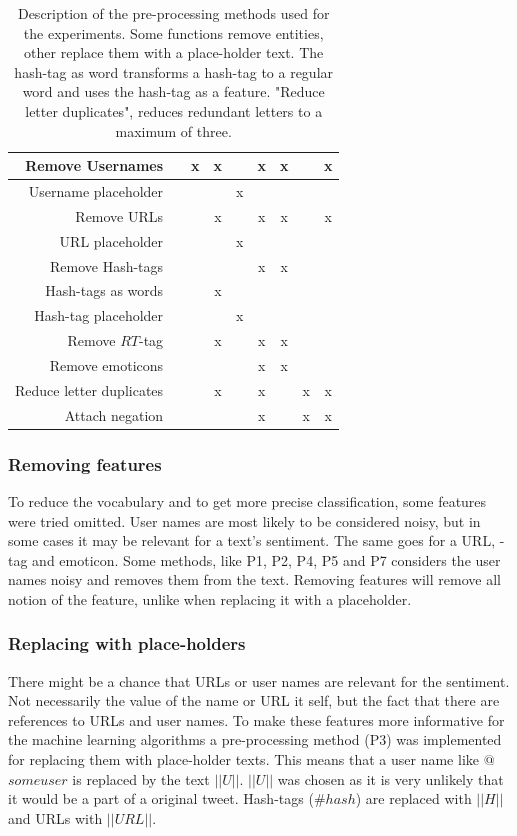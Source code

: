 \begin{table}[!htb]
\begin{tabular}{|r||c|c|c|c|c|c|c|c|}
	 
		Remove Usernames                     & & x & x &   & x & x & & x \\ \hline
		Username placeholder       & &   &   & x &   &   & & \\ \hline
		Remove URLs                          & &   & x &   & x & x & & x \\ \hline
		URL placeholder        & &   &   & x &   &   & & \\ \hline
		Remove Hash-tags                     & &   &   &   & x & x & & \\ \hline
		Hash-tags as words                   & &   & x &   &   &   & & \\ \hline
		Hash-tag placeholder          & &   &   & x &   &   & & \\ \hline
		Remove $RT$-tag                      & &   & x &   & x & x & & \\ \hline
		Remove emoticons                     & &   &   &   & x & x & & \\ \hline
		Reduce letter duplicates             & &   & x &   & x &   & x & x \\ \hline
		Attach negation  & &   &   &   & x &   & x & x \\ \hline
	\end{tabular}
	\caption[Description of used pre-processing methods]{Description of the pre-processing methods used for the experiments. Some functions remove entities, other replace them with a place-holder text. The hash-tag as word transforms a hash-tag to a regular word and uses the hash-tag as a feature. "Reduce letter duplicates", reduces redundant letters to a maximum of three.}
	\label{tab:preproc_desc}
\end{table}

\subsubsection{Removing features}
To reduce the vocabulary and to get more precise classification, some features were tried omitted. User names are most likely to be considered noisy, but in some cases it may be relevant for a text's sentiment. The same goes for a URL, -tag and emoticon. Some methods, like P1, P2, P4, P5 and P7 considers the user names noisy and removes them from the text. Removing features will remove all notion of the feature, unlike when replacing it with a placeholder.

\subsubsection{Replacing with place-holders}
There might be a chance that URLs or user names are relevant for the sentiment. Not necessarily the value of the name or URL it self, but the fact that there are references to URLs and user names. To make these features more informative for the machine learning algorithms a pre-processing method (P3) was implemented for replacing them with place-holder texts. This means that a user name like $@$$someuser$ is replaced by the text $||U||$. $||U||$ was chosen as it is very unlikely that it would be a part of a original tweet. Hash-tags ($\#hash$) are replaced with $||H||$ and URLs with $||URL||$. 

